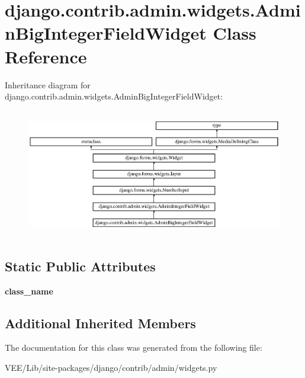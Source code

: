 \hypertarget{classdjango_1_1contrib_1_1admin_1_1widgets_1_1_admin_big_integer_field_widget}{}\section{django.\+contrib.\+admin.\+widgets.\+Admin\+Big\+Integer\+Field\+Widget Class Reference}
\label{classdjango_1_1contrib_1_1admin_1_1widgets_1_1_admin_big_integer_field_widget}
Inheritance diagram for django.\+contrib.\+admin.\+widgets.\+Admin\+Big\+Integer\+Field\+Widget\+:\begin{figure}[H]
\begin{center}
\leavevmode
\includegraphics[height=5.664740cm]{classdjango_1_1contrib_1_1admin_1_1widgets_1_1_admin_big_integer_field_widget}
\end{center}
\end{figure}
\subsection*{Static Public Attributes}
\begin{DoxyCompactItemize}
\item 
\mbox{\label{classdjango_1_1contrib_1_1admin_1_1widgets_1_1_admin_big_integer_field_widget_a40de113409d9d1c36008404ebfe62e24}} 
{\bfseries class\+\_\+name}
\end{DoxyCompactItemize}
\subsection*{Additional Inherited Members}


The documentation for this class was generated from the following file\+:\begin{DoxyCompactItemize}
\item 
V\+E\+E/\+Lib/site-\/packages/django/contrib/admin/widgets.\+py\end{DoxyCompactItemize}
